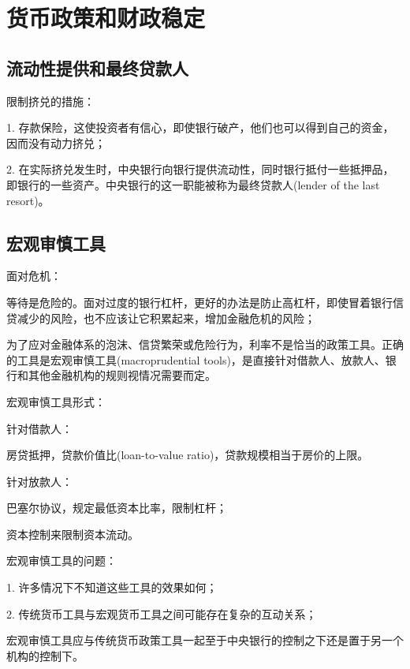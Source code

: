 \documentclass{article}
\begin{document}
\section{货币政策和财政稳定}

\subsection{流动性提供和最终贷款人}

限制挤兑的措施：

1. 存款保险，这使投资者有信心，即使银行破产，他们也可以得到自己的资金，因而没有动力挤兑；

2. 在实际挤兑发生时，中央银行向银行提供流动性，同时银行抵付一些抵押品，即银行的一些资产。中央银行的这一职能被称为最终贷款人(lender of the last resort)。

\subsection{宏观审慎工具}

面对危机：

等待是危险的。面对过度的银行杠杆，更好的办法是防止高杠杆，即使冒着银行信贷减少的风险，也不应该让它积累起来，增加金融危机的风险；

为了应对金融体系的泡沫、信贷繁荣或危险行为，利率不是恰当的政策工具。正确的工具是宏观审慎工具(macroprudential tools)，是直接针对借款人、放款人、银行和其他金融机构的规则视情况需要而定。

\hspace*{\fill}

宏观审慎工具形式：

针对借款人：

房贷抵押，贷款价值比(loan-to-value ratio)，贷款规模相当于房价的上限。

针对放款人：

巴塞尔协议，规定最低资本比率，限制杠杆；

资本控制来限制资本流动。

\hspace*{\fill}

宏观审慎工具的问题：

1. 许多情况下不知道这些工具的效果如何；

2. 传统货币工具与宏观货币工具之间可能存在复杂的互动关系；

宏观审慎工具应与传统货币政策工具一起至于中央银行的控制之下还是置于另一个机构的控制下。
\end{document}
